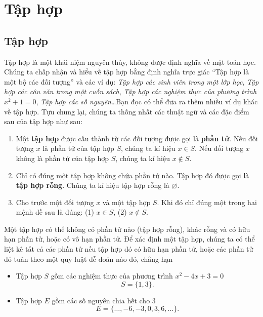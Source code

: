 \section{Tập hợp}

\subsection{Tập hợp}

Tập hợp là một khái niệm nguyên thủy, không được định nghĩa về mặt toán học. Chúng ta chấp nhận và hiểu về tập hợp bằng định nghĩa trực giác ``Tập hợp là một bộ các đối tượng'' và các ví dụ: \textit{Tập hợp các sinh viên trong một lớp học}, \textit{Tập hợp các câu văn trong một cuốn sách}, \textit{Tập hợp các nghiệm thực của phương trình $x^{2} + 1 = 0$}, \textit{Tập hợp các số nguyên}\ldots Bạn đọc có thể đưa ra thêm nhiều ví dụ khác về tập hợp. Tựu chung lại, chúng ta thống nhất các thuật ngữ và các đặc điểm sau của tập hợp như sau:
\begin{enumerate}[label={(\arabic*)},itemsep=0pt]
    \item Một \textbf{tập hợp} được cấu thành từ các đối tượng được gọi là \textbf{phần tử}. Nếu đối tượng $x$ là phần tử của tập hợp $S$, chúng ta kí hiệu $x\in S$. Nếu đối tượng $x$ không là phần tử của tập hợp $S$, chúng ta kí hiệu $x\notin S$.
    \item Chỉ có đúng một tập hợp không chứa phần tử nào. Tập hợp đó được gọi là \textbf{tập hợp rỗng}. Chúng ta kí hiệu tập hợp rỗng là $\varnothing$.
    \item Cho trước một đối tượng $x$ và một tập hợp $S$. Khi đó chỉ đúng một trong hai mệnh đề sau là đúng: (1) $x\in S$, (2) $x\notin S$.
\end{enumerate}

Một tập hợp có thể không có phần tử nào (tập hợp rỗng), khác rỗng và có hữu hạn phần tử, hoặc có vô hạn phần tử. Để xác định một tập hợp, chúng ta có thể liệt kê tất cả các phần tử nếu tập hợp đó có hữu hạn phần tử, hoặc các phần tử đó tuân theo một quy luật dễ đoán nào đó, chẳng hạn
\begin{itemize}
    \item Tập hợp $S$ gồm các nghiệm thực của phương trình $x^{2} - 4x + 3 = 0$
          \[
              S = \{ 1, 3 \}.
          \]
    \item Tập hợp $E$ gồm các số nguyên chia hết cho $3$
          \[
              E = \{ \ldots, -6, -3, 0, 3, 6, \ldots \}.
          \]
\end{itemize}

